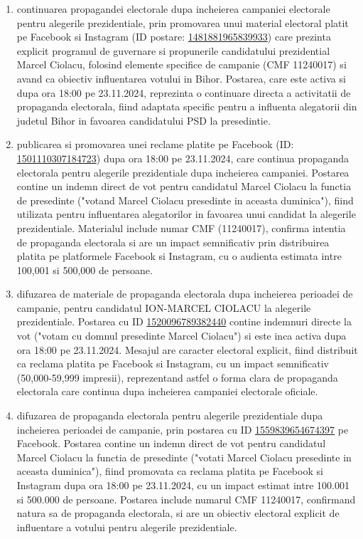 \documentclass[a4paper,12pt]{article}
\begin{document}
\begin{enumerate}[leftmargin=*, label=\arabic*.)]
    \item continuarea propagandei electorale dupa incheierea campaniei electorale pentru alegerile prezidentiale, prin promovarea unui material electoral platit pe Facebook si Instagram (ID postare: \href{https://www.facebook.com/ads/library/?id=1481881965839933}{1481881965839933}) care prezinta explicit programul de guvernare si propunerile candidatului prezidential Marcel Ciolacu, folosind elemente specifice de campanie (CMF 11240017) si avand ca obiectiv influentarea votului in Bihor. Postarea, care este activa si dupa ora 18:00 pe 23.11.2024, reprezinta o continuare directa a activitatii de propaganda electorala, fiind adaptata specific pentru a influenta alegatorii din judetul Bihor in favoarea candidatului PSD la presedintie.
    \item publicarea si promovarea unei reclame platite pe Facebook (ID: \href{https://www.facebook.com/ads/library/?id=1501110307184723}{1501110307184723}) dupa ora 18:00 pe 23.11.2024, care continua propaganda electorala pentru alegerile prezidentiale dupa incheierea campaniei. Postarea contine un indemn direct de vot pentru candidatul Marcel Ciolacu la functia de presedinte ("votand Marcel Ciolacu presedinte in aceasta duminica"), fiind utilizata pentru influentarea alegatorilor in favoarea unui candidat la alegerile prezidentiale. Materialul include numar CMF (11240017), confirma intentia de propaganda electorala si are un impact semnificativ prin distribuirea platita pe platformele Facebook si Instagram, cu o audienta estimata intre 100,001 si 500,000 de persoane.
    \item difuzarea de materiale de propaganda electorala dupa incheierea perioadei de campanie, pentru candidatul ION-MARCEL CIOLACU la alegerile prezidentiale. Postarea cu ID \href{https://www.facebook.com/ads/library/?id=1520096789382440}{1520096789382440} contine indemnuri directe la vot ("votam cu domnul presedinte Marcel Ciolacu") si este inca activa dupa ora 18:00 pe 23.11.2024. Mesajul are caracter electoral explicit, fiind distribuit ca reclama platita pe Facebook si Instagram, cu un impact semnificativ (50,000-59,999 impresii), reprezentand astfel o forma clara de propaganda electorala care continua dupa incheierea campaniei electorale oficiale.
    \item difuzarea de propaganda electorala pentru alegerile prezidentiale dupa incheierea perioadei de campanie, prin postarea cu ID \href{https://www.facebook.com/ads/library/?id=1559839654674397}{1559839654674397} pe Facebook. Postarea contine un indemn direct de vot pentru candidatul Marcel Ciolacu la functia de presedinte ("votati Marcel Ciolacu presedinte in aceasta duminica"), fiind promovata ca reclama platita pe Facebook si Instagram dupa ora 18:00 pe 23.11.2024, cu un impact estimat intre 100.001 si 500.000 de persoane. Postarea include numarul CMF 11240017, confirmand natura sa de propaganda electorala, si are un obiectiv electoral explicit de influentare a votului pentru alegerile prezidentiale.

\end{enumerate}
\end{document}
